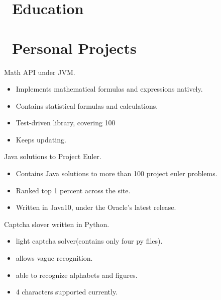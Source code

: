 \documentclass{resume}
\begin{document}



\section{\faGraduationCap\ Education}

\section{\faUsers\ Personal Projects}
Math API under JVM.
\begin{itemize}
  \item Implements mathematical formulas and expressions natively.
  \item Contains statistical formulas and calculations.
  \item Test-driven library, covering 100%
  \item Keeps updating.
\end{itemize}

Java solutions to Project Euler.
\begin{itemize}
  \item Contains Java solutions to more than 100 project euler problems.
  \item Ranked top 1 percent across the site.
  \item Written in Java10, under the Oracle's latest release.
\end{itemize}

Captcha slover written in Python.
\begin{itemize}
  \item light captcha solver(contains only four py files).
  \item allows vague recognition.
  \item able to recognize alphabets and figures.
  \item 4 characters supported currently.
\end{itemize}
\end{document}
